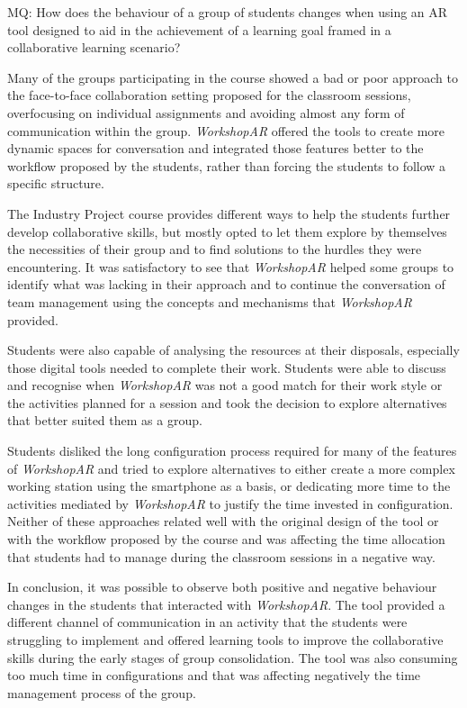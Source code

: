 \begin{displayquote}
    MQ: How does the behaviour of a group of students changes when using an AR tool designed to aid in the achievement of a learning goal framed in a collaborative learning scenario?
\end{displayquote}

Many of the groups participating in the course showed a bad or poor approach  to the face-to-face collaboration setting proposed for the classroom sessions, overfocusing on individual
assignments and avoiding almost any form of communication within the group. \emph{WorkshopAR} offered the tools to create more dynamic spaces for conversation and integrated those features
better to the workflow proposed by the students, rather than forcing the students to follow a specific structure.

The Industry Project course provides different ways to help the students further develop collaborative skills, but mostly opted to let them explore by themselves the necessities of their
group and to find solutions to the hurdles they were encountering. It was satisfactory to see that \emph{WorkshopAR} helped some groups to identify what was lacking in their approach and to
continue the conversation of team management using the concepts and mechanisms that \emph{WorkshopAR} provided.

Students were also capable of analysing the resources at their disposals, especially those digital tools needed to complete their work. Students were able to discuss and recognise when
\emph{WorkshopAR} was not a good match for their work style or the activities planned for a session and took the decision to explore alternatives that better suited them as a group.

Students disliked the long configuration process required for many of the features of \emph{WorkshopAR} and tried to explore alternatives to either create a more complex working station
using the smartphone as a basis, or dedicating more time to the activities mediated by \emph{WorkshopAR} to justify the time invested in configuration. Neither of these approaches related
well with the original design of the tool or with the workflow proposed by the course and was affecting the time allocation that students had to manage during the classroom sessions in a
negative way.

In conclusion, it was possible to observe both positive and negative behaviour changes in the students that interacted with \emph{WorkshopAR}. The tool provided a different channel of
communication in an activity that the students were struggling to implement and offered learning tools to improve the collaborative skills during the early stages of group consolidation.
The tool was also consuming too much time in configurations and that was affecting negatively the time management process of the group.

